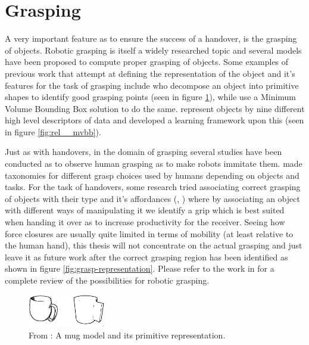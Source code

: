\section{Grasping}
A very important feature as to ensure the success of a handover, is the grasping of objects. Robotic grasping is itself a widely researched topic and several models have been proposed to compute proper grasping of objects. Some examples of previous work that attempt at defining the representation of the object and it's features for the task of grasping include \textcite{Miller2003} who decompose an object into primitive shapes to identify good grasping points (seen in figure \ref{fig:rel__shape-primitives}), while \textcite{Huebner2008} use a Minimum Volume Bounding Box solution to do the same. \textcite{Morales} represent objects by nine different high level descriptors of data and developed a learning framework upon this (seen in figure \ref{fig:rel__mvbb}).

Just as with handovers, in the domain of grasping several studies have been conducted as to observe human grasping as to make robots immitate them. \parencite{Cutkosky1990} \parencite{Feix2009} \parencite{Kang1993} made taxonomies for different grasp choices used by humans depending on objects and tasks. For the task of handovers, some research tried associating correct grasping of objects with their type and it's affordances (\parencite{Song2015}, \parencite{Chan2014}) where by associating an object with different ways of manipulating it we identify a grip which is best suited when handing it over as to increase productivity for the receiver. Seeing how force closures are usually quite limited in terms of mobility (at least relative to the human hand), this thesis will not concentrate on the actual grasping and just leave it as future work after the correct grasping region has been identified as shown in figure \ref{fig:grasp-representation}. Please refer to the work in \parencite{Sahbani2012} for a complete review of the possibilities for robotic grasping.

\begin{figure}
	\centering
	\includegraphics[width=0.3\textwidth]{img/related-work/shape-primitives.png}
	\caption{From \parencite{Miller2003}: A mug model and its primitive representation.}
	\label{fig:rel__shape-primitives}
\end{figure}


